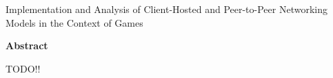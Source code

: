 \thispagestyle{plain}
\begin{center}
  \makeatletter
  \Large
  \textbf{\@title}

  \vspace*{0.4cm}
  \large
  Implementation and Analysis of Client-Hosted and Peer-to-Peer Networking Models in the Context of Games

  \vspace*{0.4cm}
  \textbf{\@author}

  \vspace*{0.9cm}
  \textbf{Abstract}
  \makeatother
\end{center}
TODO!!
